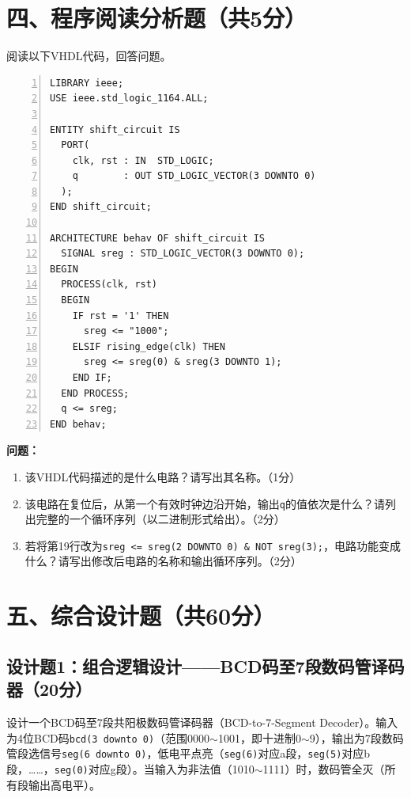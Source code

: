 \newpage

\section*{四、程序阅读分析题（共5分）}

阅读以下VHDL代码，回答问题。

\begin{lstlisting}[caption={分析用VHDL代码}, numbers=left]
LIBRARY ieee;
USE ieee.std_logic_1164.ALL;

ENTITY shift_circuit IS
  PORT(
    clk, rst : IN  STD_LOGIC;
    q        : OUT STD_LOGIC_VECTOR(3 DOWNTO 0)
  );
END shift_circuit;

ARCHITECTURE behav OF shift_circuit IS
  SIGNAL sreg : STD_LOGIC_VECTOR(3 DOWNTO 0);
BEGIN
  PROCESS(clk, rst)
  BEGIN
    IF rst = '1' THEN
      sreg <= "1000";
    ELSIF rising_edge(clk) THEN
      sreg <= sreg(0) & sreg(3 DOWNTO 1);
    END IF;
  END PROCESS;
  q <= sreg;
END behav;
\end{lstlisting}

\begin{framed}
\textbf{问题：}
\begin{enumerate}[label=(\arabic*)]
  \item 该VHDL代码描述的是什么电路？请写出其名称。（1分）
  \item 该电路在复位后，从第一个有效时钟边沿开始，输出\texttt{q}的值依次是什么？请列出完整的一个循环序列（以二进制形式给出）。（2分）
  \item 若将第19行改为\texttt{sreg <= sreg(2 DOWNTO 0) \& NOT sreg(3);}，电路功能变成什么？请写出修改后电路的名称和输出循环序列。（2分）
\end{enumerate}
\end{framed}

\newpage

\section*{五、综合设计题（共60分）}

\subsection*{设计题1：组合逻辑设计——BCD码至7段数码管译码器（20分）}

设计一个BCD码至7段共阳极数码管译码器（BCD-to-7-Segment Decoder）。输入为4位BCD码\texttt{bcd(3 downto 0)}（范围0000$\sim$1001，即十进制0$\sim$9），输出为7段数码管段选信号\texttt{seg(6 downto 0)}，低电平点亮（\texttt{seg(6)}对应a段，\texttt{seg(5)}对应b段，……，\texttt{seg(0)}对应g段）。当输入为非法值（1010$\sim$1111）时，数码管全灭（所有段输出高电平）。

